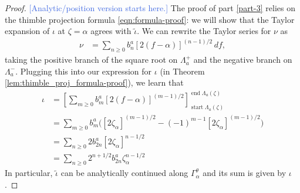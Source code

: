 \documentclass{article}
\newcommand{\fracderiv}[3]{\partial^{#1}_{#2, #3}}
\newcommand{\laplace}{\mathcal{L}}
\theoremstyle{definition}
\theoremstyle{plain}
\begin{document}
\begin{proof}
\textcolor{RoyalBlue}{[Analytic/position version starts here.]} The proof of part \ref{part-3} relies on the thimble projection formula \eqref{eqn:formula-proof}: we will show that the Taylor expansion of $\iota$ at $\zeta=\alpha$ agrees with $\tilde{\iota}$. We can rewrite the Taylor series for $\nu$ as
\begin{align*}
\nu & = \sum_{n \ge 0} b_n^a [2(f - \alpha)]^{(n - 1)/2}\,df,
\end{align*}
taking the positive branch of the square root on $\Lambda^+_a$ and the negative branch on $\Lambda^-_a$. Plugging this into our expression for $\iota$ (in Theorem \ref{lem:thimble_proj_formula-proof}), we learn that
\begin{align*}
\iota & = \left[ \sum_{m \ge 0} b_m^a [2(f - \alpha)]^{(m - 1)/2} \right]_{\operatorname{start} \Lambda_a(\zeta)}^{\operatorname{end} \Lambda_a(\zeta)} \\
& = \sum_{m \ge 0} b_m^a \Big( [2\zeta_\alpha]^{(m - 1)/2} - (-1)^{m-1}[2\zeta_\alpha]^{(m - 1)/2} \Big) \\
& = \sum_{n \ge 0} 2 b_{2n}^a [2\zeta_\alpha]^{n - 1/2} \\
& = \sum_{n \ge 0} 2^{n+1/2} b_{2n}^a \zeta_\alpha^{n - 1/2}
\end{align*}
In particular, $\tilde{\iota}$ can be analytically continued along $\Gamma_\alpha^\theta$ and its sum is given by $\iota$. %


\end{proof}
\end{document}

